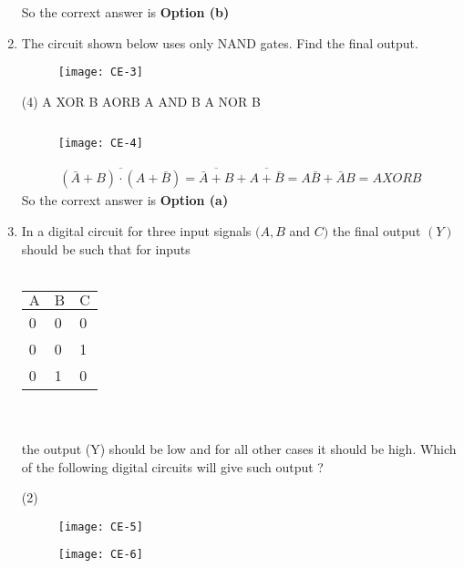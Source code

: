 \begin{enumerate}
\begin{answer}
$$	$$
	So the corrext answer is \textbf{Option (b)}
	\end{answer}
	\item  The circuit shown below uses only NAND gates. Find the final output. 
	\begin{figure}[H]
		\centering
		\texttt{[image: CE-3]}
	\end{figure}
	 \begin{tasks}(4)
		\task[\textbf{a.}]A XOR B
		\task[\textbf{b.}]$\mathrm{AOR} \mathrm{B}$
		\task[\textbf{c.}]A AND B
		\task[\textbf{d.}] A NOR B
	\end{tasks}
	\begin{answer}$\left. \right. $\\
		\begin{figure}[H]
			\centering
			\texttt{[image: CE-4]}
		\end{figure}
		$$
		\begin{aligned}
		\overline{(\bar{A}+B) \cdot(A+\bar{B})}=\overline{\bar{A}+B}+\overline{A+\bar{B}}=A \bar{B}+\bar{A} B=A X O R B
	\end{aligned}
	$$
		So the corrext answer is \textbf{Option (a)}
	\end{answer}
	\item In a digital circuit for three input signals $(A, B$ and $C)$ the final output $(Y)$ should be such that for inputs\\\\
	\begin{tabular}{lll}
		$\mathrm{A}$ & $\mathrm{B}$ & $\mathrm{C}$ \\
		\hline 0 & 0 & 0 \\
		0 & 0 & 1 \\
		0 & 1 & 0 \\
		\hline
	\end{tabular}\\\\
	the output (Y) should be low and for all other cases it should be high. Which of the following digital circuits will give such output ?
	 \begin{tasks}(2)
		\task[\textbf{a.}]\begin{figure}[H]
			\centering
			\texttt{[image: CE-5]}
		\end{figure}
		\task[\textbf{b.}]\begin{figure}[H]
			\centering
			\texttt{[image: CE-6]}
		\end{figure}
		\task[\textbf{c.}]\begin{figure}[H]

\end{figure}
\end{tasks}
\end{enumerate}
